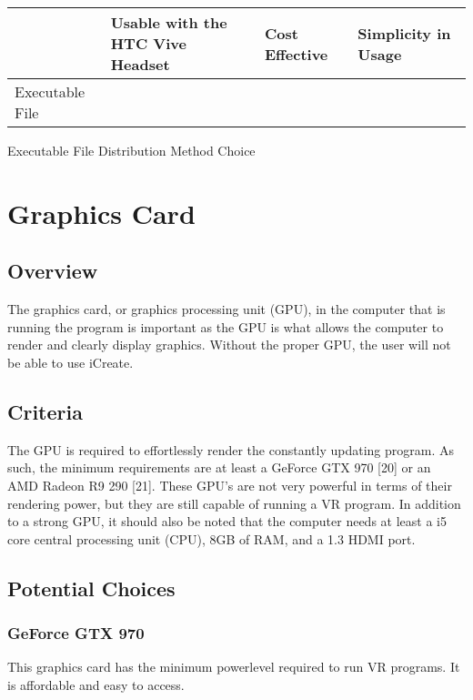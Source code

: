\documentclass[letterpaper,10pt,onecolumn,compsoc]{IEEEtran}
\begin{document}
\begin{center}
\begin{tabular}{ |  P{3.5cm} | P{6cm} | P{2.5cm} | P{3.5cm} | } 
 	\hline
 	 & Usable with the HTC Vive Headset & Cost Effective & Simplicity in Usage \\ 
 	\hline 		
 	Executable File & \checkmark & \checkmark & \checkmark \\ 
 	\hline
\end{tabular}
\end{center}

\begin{center}
Executable File Distribution Method Choice
\end{center}

\newpage

\section{Graphics Card}


\subsection{Overview}
The graphics card, or graphics processing unit (GPU), in the computer that is running the program is important as the GPU is what allows the computer to render and clearly display graphics. Without the proper GPU, the user will not be able to use iCreate.

\subsection{Criteria}
The GPU is required to effortlessly render the constantly updating program. As such, the minimum requirements are at least a GeForce GTX 970 [20] or an AMD Radeon R9 290 [21]. These GPU’s are not very powerful in terms of their rendering power, but they are still capable of running a VR program. In addition to a strong GPU, it should also be noted that the computer needs at least a i5 core central processing unit (CPU), 8GB of RAM, and a 1.3 HDMI port. 

\subsection{Potential Choices}

\subsubsection{GeForce GTX 970}
This graphics card has the minimum powerlevel required to run VR programs. It is affordable and easy to access.
\end{document}
